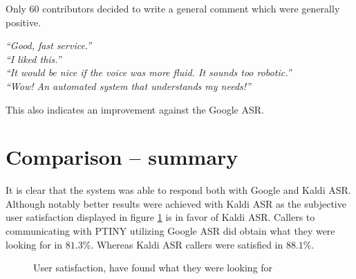 Only 60 contributors decided to write a general comment which were generally positive.

\begin{flushleft}
\textit{``Good, fast service.''} \\
\textit{``I liked this.''} \\
\textit{``It would be nice if the voice was more fluid. It sounds too robotic.''} \\
\textit{``Wow! An automated system that understands my needs!''} \\
\end{flushleft}

\noindent This also indicates an improvement against the Google \ac{ASR}.

\section{Comparison -- summary}

It is clear that the system was able to respond both with Google and Kaldi \ac{ASR}.
Although notably better results were achieved with Kaldi \ac{ASR} as the subjective user satisfaction displayed in figure \ref{fig:us} is in favor of Kaldi \ac{ASR}.
Callers to communicating with \ac{PTINY} utilizing Google \ac{ASR} did obtain what they were looking for in $81.3\%$.
Whereas Kaldi \ac{ASR} callers were satisfied in $88.1\%$.

\begin{figure}[ht]
\caption{User satisfaction, have found what they were looking for}
\label{fig:us}
\end{figure}

